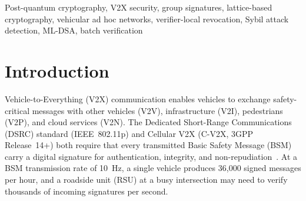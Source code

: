 \documentclass[conference,10pt]{IEEEtran}
\newcommand{\shake}{\textsf{SHAKE256}}
\begin{document}
\begin{abstract}
This paper presents \textsc{PQ-V2X-GS}, a lattice-based group signature scheme designed specifically for post-quantum V2X authentication. Our construction achieves five key properties simultaneously: (1)~\emph{anonymity}---verifiers learn only that a signer is a valid group member; (2)~\emph{traceability}---a designated Group Manager can open signatures for accident investigation; (3)~\emph{time-windowed linkability}---signatures within the same 5-minute window share a deterministic pseudonym tag enabling Sybil attack detection while preserving cross-window unlinkability; (4)~\emph{verifier-local revocation}---revoked members are identified without real-time communication with the Group Manager; and (5)~\emph{batch verification}---amortized verification of over 1{,}000 signatures per second for high-density traffic scenarios. The scheme is built upon Module-SIS and Module-LWE assumptions, leveraging ML-DSA (FIPS~204) for the base signature primitive, \shake{} for pseudonym tag derivation, and ML-KEM (FIPS~203) for encrypted identity escrow. We achieve group signature sizes of approximately 2~KB, private key sizes of approximately 1~KB per member, and single-verification latency under 1~ms. We provide formal security proofs reducing anonymity to the Module-LWE assumption, traceability to the Module-SIS assumption, and non-frameability to the EUF-CMA security of ML-DSA. Performance evaluation demonstrates that \textsc{PQ-V2X-GS} meets the real-time requirements of SAE~J2735 BSM processing while providing quantum resistance, and we present a complementary misbehavior detection framework using post-quantum linkable ring signatures.
\end{abstract}

\begin{IEEEkeywords}
Post-quantum cryptography, V2X security, group signatures, lattice-based cryptography, vehicular ad hoc networks, verifier-local revocation, Sybil attack detection, ML-DSA, batch verification
\end{IEEEkeywords}

\section{Introduction}
\label{sec:intro}

Vehicle-to-Everything (V2X) communication enables vehicles to exchange safety-critical messages with other vehicles (V2V), infrastructure (V2I), pedestrians (V2P), and cloud services (V2N). The Dedicated Short-Range Communications (DSRC) standard (IEEE~802.11p) and Cellular V2X (C-V2X, 3GPP Release~14+) both require that every transmitted Basic Safety Message (BSM) carry a digital signature for authentication, integrity, and non-repudiation~\cite{ieee16092, saej2735}. At a BSM transmission rate of 10~Hz, a single vehicle produces 36{,}000 signed messages per hour, and a roadside unit (RSU) at a busy intersection may need to verify thousands of incoming signatures per second.
\end{document}
